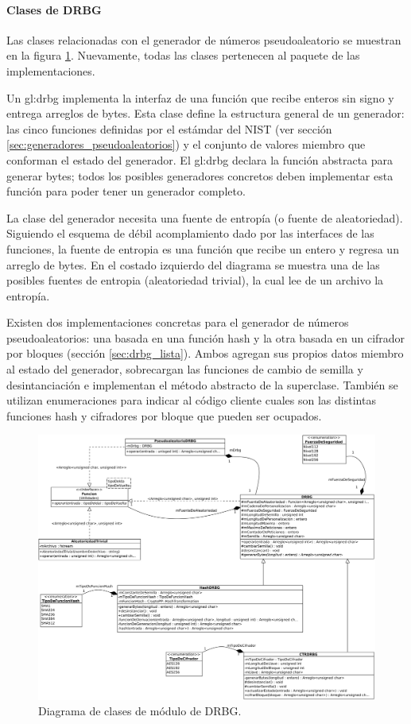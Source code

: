 %
%
%

\paragraph{Clases de DRBG}

Las clases relacionadas con el generador de números pseudoaleatorio se muestran
en la figura \ref{clases_drbg}. Nuevamente, todas las clases pertenecen al
paquete de las implementaciones.

Un \gls{gl:drbg} implementa la interfaz de una función que recibe enteros sin
signo y entrega arreglos de bytes. Esta clase define la estructura general de un
generador: las cinco funciones definidas por el estámdar del NIST (ver sección
\ref{sec:generadores_pseudoaleatorios}) y el conjunto de valores miembro que
conforman el estado del generador. El \gls{gl:drbg} declara la función abstracta
para generar bytes; todos los posibles generadores concretos deben implementar
esta función para poder tener un generador completo.

La clase del generador necesita una fuente de entropía (o fuente de
aleatoriedad). Siguiendo el esquema de débil acomplamiento dado por las
interfaces de las funciones, la fuente de entropia es una función que recibe un
entero y regresa un arreglo de bytes. En el costado izquierdo del diagrama se
muestra una de las posibles fuentes de entropia (aleatoriedad trivial), la cual
lee de un archivo la entropía.

Existen dos implementaciones concretas para el generador de números
pseudoaleatorios: una basada en una función hash y la otra basada en un cifrador
por bloques (sección \ref{sec:drbg_lista}). Ambos agregan sus propios datos
miembro al estado del generador, sobrecargan las funciones de cambio de semilla
y desintanciación e implementan el método abstracto de la superclase. También se
utilizan enumeraciones para indicar al código cliente cuales son las distintas
funciones hash y cifradores por bloque que pueden ser ocupados.

\begin{figure}
  \begin{center}
    \includegraphics[width=0.8\linewidth]{diagramas/drbg.png}
    \caption{Diagrama de clases de módulo de DRBG.}
    \label{clases_drbg}
  \end{center}
\end{figure}
